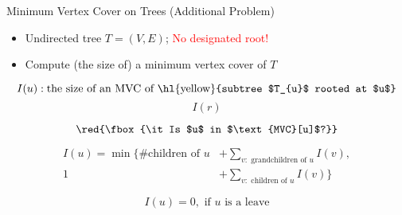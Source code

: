 
\begin{frame}{}
  \begin{exampleblock}{Minimum Vertex Cover on Trees (Additional Problem)}
    \begin{itemize}
      \item Undirected tree $T = (V, E)$; \textcolor{red}{No designated root!}
      \item Compute (the size of) a minimum vertex cover of $T$
    \end{itemize}
  \end{exampleblock}

  \vspace{0.50cm}
\end{frame}
\begin{frame}{}
  \centerline{}

  \pause
  \[
    I(u): \text{the size of an MVC of \hl{yellow}{subtree $T_{u}$ rooted at $u$}}
  \]
  \[
    I(r)
  \]

  \pause
  \[
    \red{\fbox{\it Is $u$ in $\text{MVC}[u]$?}}
  \]

  \pause
  \begin{align*} 
    I(u) = \min \Big\{\text{\# children of } u &+ \sum_{v: \text{ grandchildren of } u} I(v), \\
	    1 &+ \sum_{v: \text{ children of } u} I(v)\Big\}
  \end{align*}

  \pause
  \[
    I(u) = 0, \text{ if $u$ is a leave}
  \]
\end{frame}

\begin{frame}{}
\end{frame}

